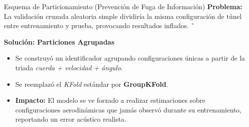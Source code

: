 \documentclass[aspectratio=169]{beamer}
\begin{document}
\begin{frame}{Esquema de Particionamiento (Prevención de Fuga de Información)}
\textbf{Problema:} La validación cruzada aleatoria simple dividiría la misma configuración de túnel entre entrenamiento y prueba, provocando resultados inflados. \~\

\textbf{Solución: Particiones Agrupadas}
\begin{itemize}
    \item Se construyó un identificador agrupando configuraciones únicas a partir de la triada \textit{cuerda + velocidad + ángulo}.
    \item Se reemplazó el \textit{KFold} estándar por \textbf{GroupKFold}.
    \item \textbf{Impacto:} El modelo se ve forzado a realizar estimaciones sobre configuraciones aerodinámicas que jamás observó durante su entrenamiento, reportando un error acústico realista.
\end{itemize}


\end{frame}
\end{document}
